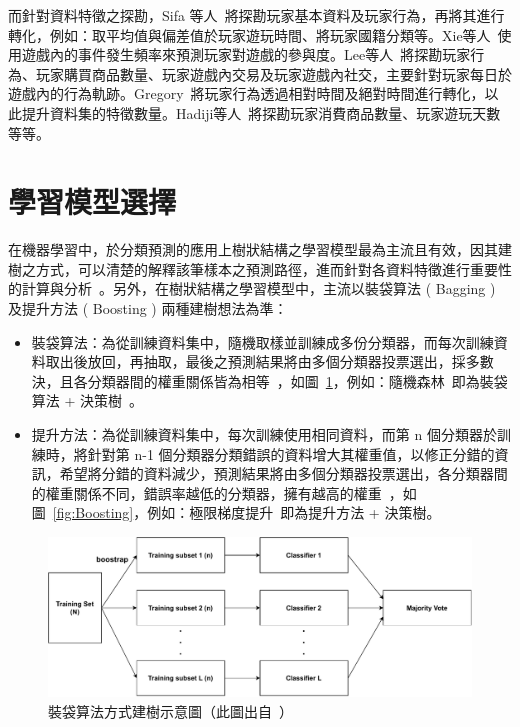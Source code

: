 而針對資料特徵之探勘，Sifa 等人~\cite{sifa2015predicting}將探勘玩家基本資料及玩家行為，再將其進行轉化，例如：取平均值與偏差值於玩家遊玩時間、將玩家國籍分類等。Xie等人~\cite{PredictionWithEventFrequency}使用遊戲內的事件發生頻率來預測玩家對遊戲的參與度。Lee等人~\cite{lee2016predicting}將探勘玩家行為、玩家購買商品數量、玩家遊戲內交易及玩家遊戲內社交，主要針對玩家每日於遊戲內的行為軌跡。Gregory~\cite{XGBoostTemporalData}將玩家行為透過相對時間及絕對時間進行轉化，以此提升資料集的特徵數量。Hadiji等人~\cite{6932876}將探勘玩家消費商品數量、玩家遊玩天數等等。

\section{學習模型選擇}

在機器學習中，於分類預測的應用上樹狀結構之學習模型最為主流且有效，因其建樹之方式，可以清楚的解釋該筆樣本之預測路徑，進而針對各資料特徵進行重要性的計算與分析~\cite{lee2018game}。另外，在樹狀結構之學習模型中，主流以裝袋算法 ( Bagging ) 及提升方法 ( Boosting ) 兩種建樹想法為準：

\begin{itemize}
    \item 裝袋算法：為從訓練資料集中，隨機取樣並訓練成多份分類器，而每次訓練資料取出後放回，再抽取，最後之預測結果將由多個分類器投票選出，採多數決，且各分類器間的權重關係皆為相等~\cite{breiman1996bagging}，如圖~\ref{fig:Bagging}，例如：隨機森林~\cite{breiman2001random}即為裝袋算法 + 決策樹~\cite{breiman1984classification}。
    \item 提升方法：為從訓練資料集中，每次訓練使用相同資料，而第 n 個分類器於訓練時，將針對第 n-1 個分類器分類錯誤的資料增大其權重值，以修正分錯的資訊，希望將分錯的資料減少，預測結果將由多個分類器投票選出，各分類器間的權重關係不同，錯誤率越低的分類器，擁有越高的權重~\cite{freund1999short}，如圖~\ref{fig:Boosting}，例如：極限梯度提升~\cite{chen2016xgboost}即為提升方法 + 決策樹。
\end{itemize}

\begin{figure}[!htb]
    \begin{center}
      \includegraphics[width=1\textwidth]{figures/Image_Bagging.pdf}
      \caption[裝袋算法方式建樹示意圖]{裝袋算法方式建樹示意圖（此圖出自~\cite{tommy2018baggingandboosting}）}
      \label{fig:Bagging}
    \end{center}
\end{figure}

